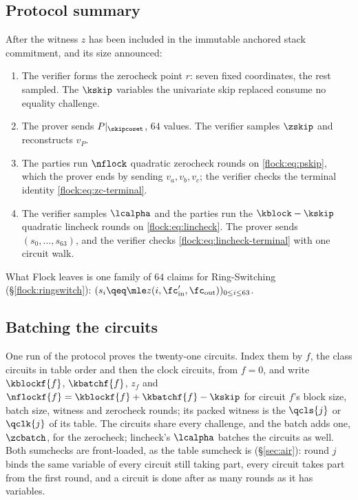 \subsection{Protocol summary}\label{flock:summary}

\begin{protocol}\label{flock:protocol}
After the witness $z$ has been included in the immutable anchored stack commitment, and its size announced:
\begin{enumerate}
\item The verifier forms the zerocheck point $r$: seven fixed coordinates, the rest sampled. The $\kskip$ variables the univariate skip replaced consume no equality challenge.
\item The prover sends $P|_{\skipcoset}$, $64$ values. The verifier samples $\zskip$ and reconstructs $v_P$.
\item The parties run $\nflock$ quadratic zerocheck rounds on \eqref{flock:eq:pskip}, which the prover ends by sending $v_a,v_b,v_c$; the verifier checks the terminal identity \eqref{flock:eq:zc-terminal}.
\item The verifier samples $\lcalpha$ and the parties run the $\kblock-\kskip$ quadratic lincheck rounds on \eqref{flock:eq:lincheck}. The prover sends $(s_0,\ldots,s_{63})$, and the verifier checks \eqref{flock:eq:lincheck-terminal} with one circuit walk.
\end{enumerate}
What Flock leaves is one family of $64$ claims for Ring-Switching (\S\ref{flock:ringswitch}): $(s_i \qeq \mle z(i, \fc'_{\mathrm{in}},\fc_{\mathrm{out}}))_{0 \leq i \leq 63}$.
\end{protocol}

\subsection{Batching the circuits}\label{flock:batch}

One run of the protocol proves the twenty-one circuits. Index them by $f$, the class circuits in table order and then the clock circuits, from $f=0$, and write $\kblockf{f}$, $\kbatchf{f}$, $z_f$ and $\nflockf{f}=\kblockf{f}+\kbatchf{f}-\kskip$ for circuit $f$'s block size, batch size, witness and zerocheck rounds; its packed witness is the $\qcls{j}$ or $\qclk{j}$ of its table. The circuits share every challenge, and the batch adds one, $\zcbatch$, for the zerocheck; lincheck's $\lcalpha$ batches the circuits as well. Both sumchecks are front-loaded, as the table sumcheck is (\S\ref{sec:air}): round $j$ binds the same variable of every circuit still taking part, every circuit takes part from the first round, and a circuit is done after as many rounds as it has variables.


